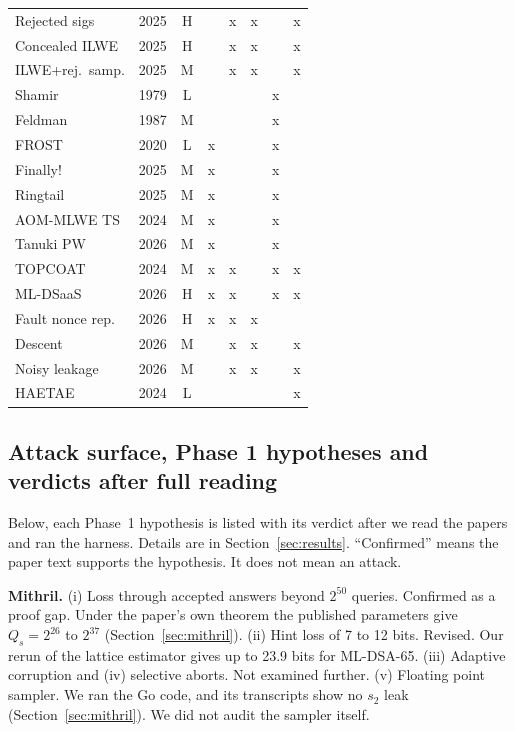\documentclass[10pt,conference,a4paper]{IEEEtran}
\begin{document}
\begin{table}[t]
\begin{tabular}{@{}llcccccc@{}}
\cite{rejected} Rejected sigs & 2025 & H &  & x & x &  & x\\
\cite{concealed} Concealed ILWE & 2025 & H &  & x & x &  & x\\
\cite{yates} ILWE+rej.\ samp. & 2025 & M &  & x & x &  & x\\
\cite{shamir} Shamir & 1979 & L &  &  &  & x & \\
\cite{feldman} Feldman & 1987 & M &  &  &  & x & \\
\cite{frost} FROST & 2020 & L & x &  &  & x & \\
\cite{finally} Finally! & 2025 & M & x &  &  & x & \\
\cite{ringtail} Ringtail & 2025 & M & x &  &  & x & \\
\cite{aommlwe} AOM-MLWE TS & 2024 & M & x &  &  & x & \\
\cite{tanuki} Tanuki PW & 2026 & M & x &  &  & x & \\
\cite{topcoat} TOPCOAT & 2024 & M & x & x &  & x & x\\
\cite{mldsaas} ML-DSaaS & 2026 & H & x & x &  & x & x\\
\cite{meng} Fault nonce rep. & 2026 & H & x & x & x &  & \\
\cite{descent} Descent & 2026 & M &  & x & x &  & x\\
\cite{noisyleak} Noisy leakage & 2026 & M &  & x & x &  & x\\
\cite{haetae} HAETAE & 2024 & L &  &  &  &  & x\\
\bottomrule
\end{tabular}
\end{table}

\subsection{Attack surface, Phase 1 hypotheses and verdicts after full reading}\label{sec:surface}
Below, each Phase~1 hypothesis is listed with its verdict after we read the papers and ran the harness. Details are in
Section~\ref{sec:results}. ``Confirmed'' means the paper text supports the hypothesis. It does not mean an attack.

\textbf{Mithril.} (i) Loss through accepted answers beyond $2^{50}$ queries. Confirmed as a proof gap. Under the paper's own
theorem the published parameters give $Q_s=2^{26}$ to $2^{37}$ (Section~\ref{sec:mithril}). (ii) Hint loss of 7 to 12
bits. Revised. Our rerun of the lattice estimator gives up to 23.9 bits for ML-DSA-65. (iii) Adaptive corruption and (iv)
selective aborts. Not examined further. (v) Floating point sampler. We ran the Go code, and its transcripts show no $s_2$
leak (Section~\ref{sec:mithril}). We did not audit the sampler itself.
\end{document}
